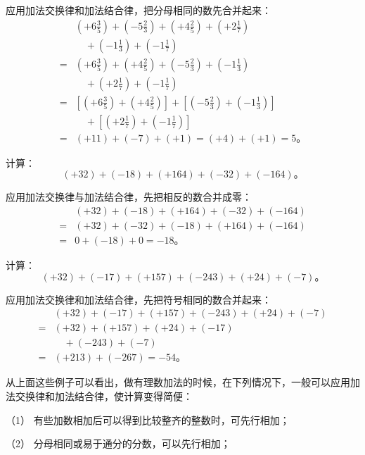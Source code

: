  应用加法交换律和加法结合律，把分母相同的数先合并起来：
\begin{align*}
&\left(+6\frac{3}{5}\right) + \left(-5\frac{2}{3}\right) + \left(+4\frac{2}{5}\right) + \left(+2\frac{1}{7}\right) \\
&\quad + \left(-1\frac{1}{3}\right) + \left(-1\frac{1}{7}\right) \\
={}& \left(+6\frac{3}{5}\right) + \left(+4\frac{2}{5}\right) + \left(-5\frac{2}{3}\right) + \left(-1\frac{1}{3}\right) \\
&\quad + \left(+2\frac{1}{7}\right) + \left(-1\frac{1}{7}\right) \\
={}& \left[\left(+6\frac{3}{5}\right) + \left(+4\frac{2}{5}\right)\right] + \left[\left(-5\frac{2}{3}\right) + \left(-1\frac{1}{3}\right)\right] \\
&\quad + \left[\left(+2\frac{1}{7}\right) + \left(-1\frac{1}{7}\right)\right] \\
={}& (+11) + (-7) + (+1) = (+4) + (+1) = 5。
\end{align*}

 计算：
\[
(+32) + (-18) + (+164) + (-32) + (-164)。
\]

 应用加法交换律与加法结合律，先把相反的数合并成零：
\begin{align*}
&(+32) + (-18) + (+164) + (-32) + (-164) \\
={}& (+32) + (-32) + (-18) + (+164) + (-164) \\
={}& 0 + (-18) + 0 = -18。
\end{align*}

 计算：
\[
(+32) + (-17) + (+157) + (-243) + (+24) + (-7)。
\]

 应用加法交换律和加法结合律，先把符号相同的数合并起来：
\begin{align*}
&(+32) + (-17) + (+157) + (-243) + (+24) + (-7) \\
={}& (+32) + (+157) + (+24) + (-17) \\
&\quad + (-243) + (-7) \\
={}& (+213) + (-267) = -54。
\end{align*}

从上面这些例子可以看出，做有理数加法的时候，在下列情况下，一般可以应用加法交换律和加法结合律，使计算变得简便：

（1） 有些加数相加后可以得到比较整齐的整数时，可先行相加；

（2） 分母相同或易于通分的分数，可以先行相加；

